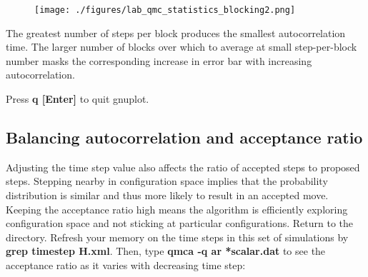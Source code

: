 
\FloatBarrier
\begin{figure}[ht!]
\begin{center}
\texttt{[image: ./figures/lab\_qmc\_statistics\_blocking2.png]}
\end{center}
\end{figure}
\FloatBarrier


The greatest number of steps per block produces the smallest autocorrelation
time.  The larger number of blocks over which to average at small
step-per-block number masks the corresponding increase in error bar with
increasing autocorrelation.

Press \textbf{q [Enter]} to quit gnuplot.

\subsection{Balancing autocorrelation and acceptance ratio}

Adjusting the time step value also affects the ratio of accepted steps to
proposed steps.  Stepping nearby in configuration space implies that the
probability distribution is similar and thus more likely to result in an
accepted move.  Keeping the acceptance ratio high means the algorithm is
efficiently exploring configuration space and not sticking at particular
configurations.  Return to the  directory.  Refresh your
memory on the time steps in this set of simulations by \textbf{grep timestep
H.xml}. Then, type \textbf{qmca -q ar *scalar.dat} to see the acceptance ratio
as it varies with decreasing time step:

